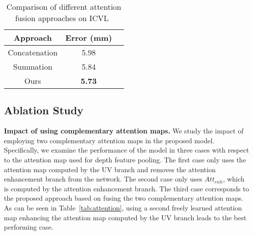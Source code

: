 \documentclass{article}
\begin{document}
\begin{table}[t]
\caption{Comparison of different attention fusion approaches on ICVL~\cite{tang2014latent}}
\centering
\setlength{\tabcolsep}{10pt}
\renewcommand{\arraystretch}{1.05}
\begin{tabular}{ccc}
            \hline
            Approach  &   Error (mm)      \\
            \hline
                Concatenation          &         5.98    \\
                Summation      &         5.84    \\
                Ours     &  \textbf{5.73}   \\
        
            \hline
        \end{tabular}
\label{tab:attentionFusion}
\end{table}
 
\subsection{Ablation Study} \label{subsection:ablation}
\textbf{Impact of using complementary attention maps.} We study the impact of employing two complementary attention maps in the proposed model. Specifically, we examine the performance of the model in three cases with respect to the attention map used for depth feature pooling. The first case only uses the attention map computed by the UV branch and removes the attention enhancement branch from the network. The second case only uses $Att_{enh}$, which is computed by the attention enhancement branch. The third case corresponds to the proposed approach based on fusing the two complementary attention maps. As can be seen in Table~\ref{tab:attention}, using a second freely learned attention map enhancing the attention map computed by the UV branch leads to the best performing case.
           
\end{document}
